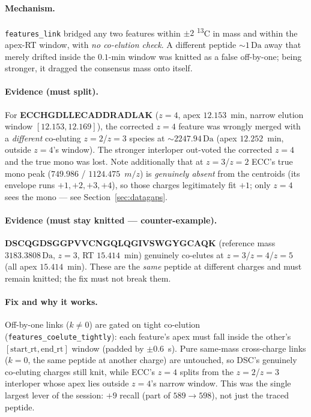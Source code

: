 \documentclass[11pt]{article}
\newcommand{\Da}{\,\text{Da}}
\newcommand{\Cthirteen}{\textsuperscript{13}C}
\newcommand{\mz}{\ensuremath{m/z}}
\newcommand{\zeq}[1]{\ensuremath{z{=}#1}}
\begin{document}
\paragraph{Mechanism.} \texttt{features\_link} bridged any two features within $\pm 2$ \Cthirteen{}
in mass and within the apex-RT window, with \emph{no co-elution check}. A different peptide
$\sim 1\Da$ away that merely drifted inside the $0.1$-min window was knitted as a false off-by-one;
being stronger, it dragged the consensus mass onto itself.

\paragraph{Evidence (must split).} For \textbf{ECCHGDLLECADDRADLAK} (\zeq{4}, apex $12.153$~min,
narrow elution window $[12.153, 12.169]$), the corrected \zeq{4} feature was wrongly merged with a
\emph{different} co-eluting \zeq{2}/\zeq{3} species at $\sim 2247.94\Da$ (apex $12.252$~min, outside
\zeq{4}'s window). The stronger interloper out-voted the corrected \zeq{4} and the true mono was
lost. Note additionally that at \zeq{3}/\zeq{2} ECC's true mono peak ($749.986$ / $1124.475$~\mz)
is \emph{genuinely absent} from the centroids (its envelope runs $+1, +2, +3, +4$), so those
charges legitimately fit $+1$; only \zeq{4} sees the mono --- see Section~\ref{sec:datagaps}.

\paragraph{Evidence (must stay knitted --- counter-example).}
\textbf{DSCQGDSGGPVVCNGQLQGIVSWGYGCAQK} (reference mass $3183.3808\Da$, \zeq{3}, RT $15.414$~min)
genuinely co-elutes at \zeq{3}/\zeq{4}/\zeq{5} (all apex $15.414$~min). These are the \emph{same}
peptide at different charges and must remain knitted; the fix must not break them.

\paragraph{Fix and why it works.} Off-by-one links ($k \neq 0$) are gated on tight co-elution
(\texttt{features\_coelute\_tightly}): each feature's apex must fall inside the other's
$[\text{start\_rt}, \text{end\_rt}]$ window (padded by $\pm 0.6$~s). Pure same-mass cross-charge
links ($k = 0$, the same peptide at another charge) are untouched, so DSC's genuinely co-eluting
charges still knit, while ECC's \zeq{4} splits from the \zeq{2}/\zeq{3} interloper whose apex lies
outside \zeq{4}'s narrow window. This was the single largest lever of the session: $+9$ recall
(part of $589 \rightarrow 598$), not just the traced peptide.
\end{document}
